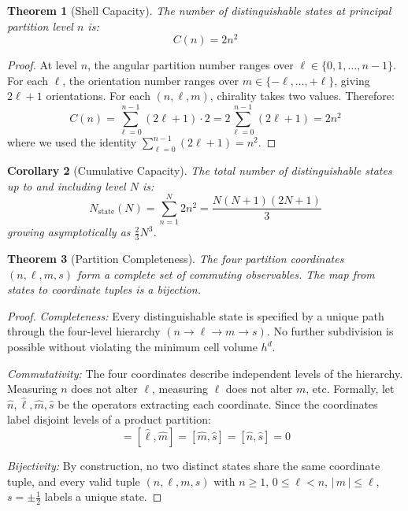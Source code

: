 \documentclass[twocolumn,10pt,a4paper]{article}
\theoremstyle{plain}
\newtheorem{theorem}{Theorem}[section]
\newtheorem{corollary}[theorem]{Corollary}
\theoremstyle{definition}
\theoremstyle{remark}
\begin{document}
\begin{theorem}[Shell Capacity]
\label{thm:capacity}
The number of distinguishable states at principal partition level $n$ is:
\begin{equation}
    C(n) = 2n^2
\end{equation}
\end{theorem}

\begin{proof}
At level $n$, the angular partition number ranges over $\ell \in \{0, 1, \ldots, n-1\}$. For each $\ell$, the orientation number ranges over $m \in \{-\ell, \ldots, +\ell\}$, giving $2\ell + 1$ orientations. For each $(n, \ell, m)$, chirality takes two values. Therefore:
\begin{equation}
    C(n) = \sum_{\ell=0}^{n-1} (2\ell + 1) \cdot 2 = 2 \sum_{\ell=0}^{n-1} (2\ell + 1) = 2n^2
\end{equation}
where we used the identity $\sum_{\ell=0}^{n-1}(2\ell+1) = n^2$.
\end{proof}

\begin{corollary}[Cumulative Capacity]
\label{cor:cumulative}
The total number of distinguishable states up to and including level $N$ is:
\begin{equation}
    N_{\mathrm{state}}(N) = \sum_{n=1}^{N} 2n^2 = \frac{N(N+1)(2N+1)}{3}
\end{equation}
growing asymptotically as $\tfrac{2}{3}N^3$.
\end{corollary}

\begin{theorem}[Partition Completeness]
\label{thm:completeness}
The four partition coordinates $(n, \ell, m, s)$ form a complete set of commuting observables. The map from states to coordinate tuples is a bijection.
\end{theorem}

\begin{proof}
\emph{Completeness:} Every distinguishable state is specified by a unique path through the four-level hierarchy $(n \to \ell \to m \to s)$. No further subdivision is possible without violating the minimum cell volume $h^d$.

\emph{Commutativity:} The four coordinates describe independent levels of the hierarchy. Measuring $n$ does not alter $\ell$, measuring $\ell$ does not alter $m$, etc. Formally, let $\hat{n}, \hat{\ell}, \hat{m}, \hat{s}$ be the operators extracting each coordinate. Since the coordinates label disjoint levels of a product partition:
\begin{equation}
    [\hat{n}, \hat{\ell}] = [\hat{\ell}, \hat{m}] = [\hat{m}, \hat{s}] = [\hat{n}, \hat{s}] = 0
\end{equation}

\emph{Bijectivity:} By construction, no two distinct states share the same coordinate tuple, and every valid tuple $(n, \ell, m, s)$ with $n \geq 1$, $0 \leq \ell < n$, $|\,m\,| \leq \ell$, $s = \pm \tfrac{1}{2}$ labels a unique state.
\end{proof}
\end{document}
